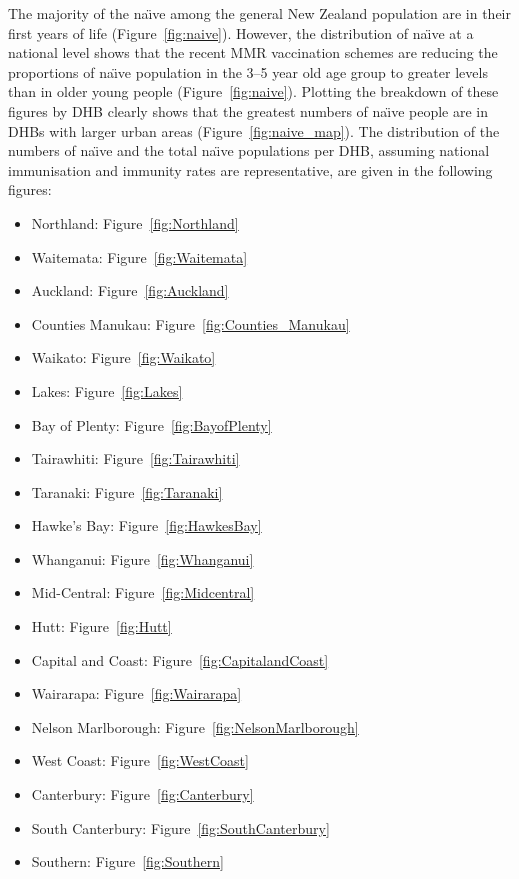 \documentclass{article}
\begin{document}
The majority of the na\"{\i}ve among the general New Zealand population are in their first years of life (Figure~\autoref{fig:naive}). However, the distribution of na\"{\i}ve at a national level shows that the recent MMR vaccination schemes are reducing the proportions of na\"{\i}ve population in the 3--5 year old age group to greater levels than in older young people  (Figure~\autoref{fig:naive}). Plotting the breakdown of these figures by DHB clearly shows that the greatest numbers of na\"{\i}ve people are in DHBs with larger urban areas (Figure~\autoref{fig:naive_map}). The distribution of the numbers of na\"{\i}ve and the total na\"{\i}ve populations per DHB, assuming national immunisation and immunity rates are representative, are given in the following figures:
\begin{itemize}[noitemsep,nolistsep]
\item Northland: Figure~\autoref{fig:Northland}
\item Waitemata: Figure~\autoref{fig:Waitemata}
\item Auckland: Figure~\autoref{fig:Auckland}
\item Counties Manukau: Figure~\autoref{fig:Counties_Manukau}
\item Waikato: Figure~\autoref{fig:Waikato}
\item Lakes: Figure~\autoref{fig:Lakes}
\item Bay of Plenty: Figure~\autoref{fig:BayofPlenty}
\item Tairawhiti: Figure~\autoref{fig:Tairawhiti}
\item Taranaki: Figure~\autoref{fig:Taranaki}
\item Hawke's Bay: Figure~\autoref{fig:HawkesBay}
\item Whanganui: Figure~\autoref{fig:Whanganui}
\item Mid-Central: Figure~\autoref{fig:Midcentral}
\item Hutt: Figure~\autoref{fig:Hutt}
\item Capital and Coast: Figure~\autoref{fig:CapitalandCoast}
\item Wairarapa: Figure~\autoref{fig:Wairarapa}
\item Nelson Marlborough: Figure~\autoref{fig:NelsonMarlborough}
\item West Coast: Figure~\autoref{fig:WestCoast}
\item Canterbury: Figure~\autoref{fig:Canterbury}
\item South Canterbury: Figure~\autoref{fig:SouthCanterbury}
\item Southern: Figure~\autoref{fig:Southern}
\end{itemize}
\end{document}
